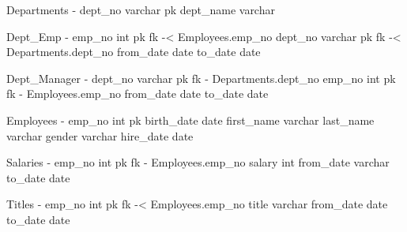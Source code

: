 Departments
-
dept_no varchar pk
dept_name varchar

Dept_Emp
-
emp_no int pk fk -< Employees.emp_no
dept_no varchar pk fk -< Departments.dept_no
from_date date
to_date date

Dept_Manager
-
dept_no varchar pk fk - Departments.dept_no
emp_no int pk fk - Employees.emp_no
from_date date
to_date date

Employees
-
emp_no int pk
birth_date date
first_name varchar
last_name varchar
gender varchar
hire_date date

Salaries
-
emp_no int pk fk - Employees.emp_no
salary int
from_date varchar
to_date date

Titles
-
emp_no int pk fk -< Employees.emp_no
title varchar
from_date date
to_date date
